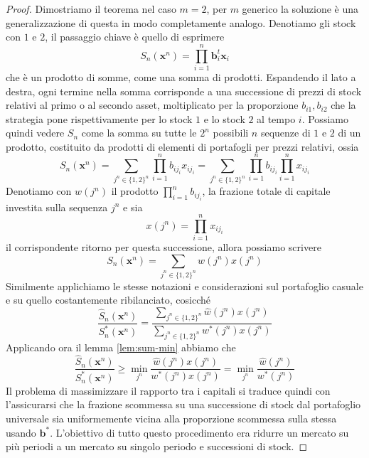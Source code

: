 \documentclass[a4paper,11pt]{book}
\theoremstyle{plain}
\theoremstyle{definition}
\theoremstyle{remark}
\newcommand{\x}{\bm{x}}
\newcommand{\B}{\bm{b}}
\newcommand{\Sh}{\hat{S}}
\begin{document}
\begin{proof}
	Dimostriamo il teorema nel caso $m=2$, per $m$ generico la soluzione è una generalizzazione di questa in modo completamente analogo.\newline
	Denotiamo gli stock con $1$ e $2$, il passaggio chiave è quello di esprimere 
	\begin{equation*}
		S_n(\x^n)=\prod_{i = 1}^n{\B_i^t\x_i}
	\end{equation*}
	che è un prodotto di somme, come una somma di prodotti. Espandendo il lato a destra, ogni termine nella somma corrisponde a una successione di prezzi di stock relativi al primo o al secondo asset, moltiplicato per la proporzione $b_{i1},b_{i2}$ che la strategia pone rispettivamente per lo stock $1$ e lo stock $2$ al tempo $i$. Possiamo quindi vedere $S_n$ come la somma su tutte le $2^n$ possibili $n$ sequenze di $1$ e $2$ di un prodotto, costituito da prodotti di elementi di portafogli per prezzi relativi, ossia
	\begin{equation*}
		S_n(\x^n) = \sum_{j^n\in\{1,2\}^n}\prod_{i = 1}^{n}{b_{ij_i}x_{ij_i}} = \sum_{j^n\in\{1,2\}^n}\prod_{i = 1}^{n}{b_{ij_i}}\prod_{i = 1}^n{x_{ij_i}}
	\end{equation*}
	Denotiamo con $w(j^n)$ il prodotto $\prod_{i = 1}^{n}{b_{ij_i}}$, la frazione totale di capitale investita sulla sequenza $j^n$ e sia
	\begin{equation*}
		x(j^n)=\prod_{i = 1}^n{x_{ij_i}}
	\end{equation*}
	il corrispondente ritorno per questa successione, allora possiamo scrivere
	\begin{equation*}
		S_n(\x^n)=\sum_{j^n\in\{1,2\}^n}{w(j^n)x(j^n)}
	\end{equation*}
	Similmente applichiamo le stesse notazioni e considerazioni sul portafoglio casuale e su quello costantemente ribilanciato, cosicché
	\begin{equation*}
		\frac{\Sh_n(\x^n)}{S_n^*(\x^n)} = \frac{\sum_{j^n\in\{1,2\}^n}{\hat{w}(j^n)x(j^n)}}{\sum_{j^n\in\{1,2\}^n}{w^*(j^n)x(j^n)}}
	\end{equation*}
	Applicando ora il lemma \ref{lem:sum-min} abbiamo che
	\begin{equation*}
		\frac{\Sh_n(\x^n)}{S_n^*(\x^n)}\geq \min\limits_{j^n}\frac{\hat{w}(j^n)x(j^n)}{w^*(j^n)x(j^n)}=\min\limits_{j^n}\frac{\hat{w}(j^n)}{w^*(j^n)}
	\end{equation*}
	Il problema di massimizzare il rapporto tra i capitali si traduce quindi con l'assicurarsi che la frazione scommessa su una successione di stock dal portafoglio universale sia uniformemente vicina alla proporzione scommessa sulla stessa usando $\B^*$. L'obiettivo di tutto questo procedimento era ridurre un mercato su più periodi a un mercato su singolo periodo e successioni di stock.\newline

\end{proof}
\end{document}
